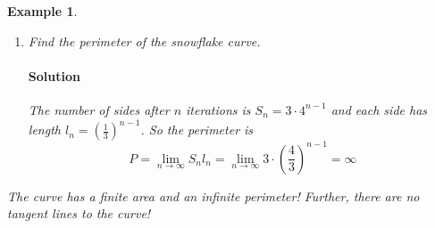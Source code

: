 \documentclass[letterpaper, 11pt, openany]{book}
\theoremstyle{mytheoremstyle}
\theoremstyle{myexamplestyle}
\newtheorem{example}{Example}[section]
\newenvironment{solution}{\paragraph{\sffamily \smaller \fontseries{b}\selectfont Solution}}{\hfill\faSquare}
\begin{document}
\begin{example}
\begin{enumerate}
        \begin{solution}
            \begin{itemize}
                \item The starting triangle has a base of 1 and a height of $\frac{\sqrt{3}}{2}$ so the starting area is $a_{0} = \frac{1}{2}\cdot 1 \cdot \frac{\sqrt{3}}{2} = \cdot \frac{\sqrt{3}}{4}$
                \item On each iteration, each existing side adds a new triangle in the middle third; we start with \(S_{0} = 3\) sides; after \(n\) iterations we have \(S_{n} = 3 \cdot 4^{n}\) sides
                \item The number of new triangles we add on the \(n\)\textsuperscript{th} iteration is \(t_{n} = S_{n-1} = 3\cdot 4^{n-1}\)
                \item Each new triangle added after $n$ iterations has an area of $a_{n} = \frac{1}{9}a_{n-1} = \frac{\sqrt{3}}{4} \cdot \frac{1}{9^{n}}$
                \item The total new area after $n$ iterations is
                \[A_{n} = a_{n} t_{n} = \frac{\sqrt{3}}{4}\cdot \frac{1}{9^{n}} \cdot 3 \cdot 4^{n-1} = \frac{\sqrt{3}}{4} \cdot \frac{3}{4}\left( \frac{4}{9} \right)^{n}\]
                \item The total area of the curve then is
                \begin{align*}
                    A   &= A_{0} + \sum_{n=1}^{\infty} A_{n} = \frac{\sqrt{3}}{4} + \frac{\sqrt{3}}{4} \sum_{n=1}^{\infty} \frac{3}{4}\left(\frac{4}{9} \right)^{n}\\
                        &= \frac{\sqrt{3}}{4} \left( 1 +  \sum_{n=1}^{\infty} \frac{3}{4}\left( \frac{4}{9} \right)^{n} \right) = \frac{\sqrt{3}}{4} \left( 1 + \frac{3}{4}\sum_{n=0}^{\infty} \left( \frac{4}{9} \right)^{n+1} \right)\\
                        &= \frac{\sqrt{3}}{4} \left( 1 + \frac{1}{3}\sum_{n=0}^{\infty} \left( \frac{4}{9} \right)^{n} \right) = \frac{\sqrt{3}}{4} \left( 1 + \frac{3}{5} \right) = \frac{2\sqrt{3}}{5}
                \end{align*}
            \end{itemize}
        \end{solution}
        
        \item Find the perimeter of the snowflake curve.        
        
        \begin{solution}
            The number of sides after $n$ iterations is $S_{n} = 3 \cdot 4^{n-1}$ and each side has length $l_{n}=\left( \frac{1}{3} \right)^{n-1}$. So the perimeter is
            \[P = \lim_{n\to\infty} S_{n} l_{n} = \lim_{n\to\infty} 3\cdot \left( \frac{4}{3} \right)^{n-1} = \infty\]
        \end{solution}
    \end{enumerate}

The curve has a finite area and an infinite perimeter! Further, there are no tangent lines to the curve!
\end{example}
\end{document}

